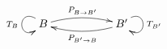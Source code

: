 \documentclass{article}
\begin{document}
\begin{displaymath}
    \xymatrix@R+2pc{%
        B
        \ar@(ul,dl)_{T_B}
        \ar@/^/[rr]^{P_{B \to B'}} &&
        B'
        \ar@(ur,dr)^{T_{B'}}
        \ar@/^/[ll]^{P_{B' \to B}}
    }
\end{displaymath}
\end{document}
